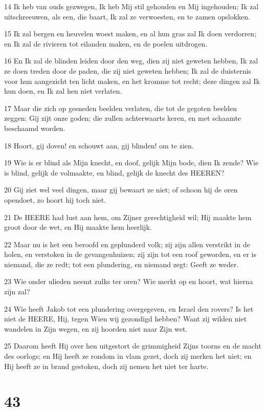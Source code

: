 \par 14 Ik heb van ouds gezwegen, Ik heb Mij stil gehouden en Mij ingehouden; Ik zal uitschreeuwen, als een, die baart, Ik zal ze verwoesten, en te zamen opslokken.
\par 15 Ik zal bergen en heuvelen woest maken, en al hun gras zal Ik doen verdorren; en Ik zal de rivieren tot eilanden maken, en de poelen uitdrogen.
\par 16 En Ik zal de blinden leiden door den weg, dien zij niet geweten hebben, Ik zal ze doen treden door de paden, die zij niet geweten hebben; Ik zal de duisternis voor hun aangezicht ten licht maken, en het kromme tot recht; deze dingen zal Ik hun doen, en Ik zal hen niet verlaten.
\par 17 Maar die zich op gesneden beelden verlaten, die tot de gegoten beelden zeggen: Gij zijt onze goden; die zullen achterwaarts keren, en met schaamte beschaamd worden.
\par 18 Hoort, gij doven! en schouwt aan, gij blinden! om te zien.
\par 19 Wie is er blind als Mijn knecht, en doof, gelijk Mijn bode, dien Ik zende? Wie is blind, gelijk de volmaakte, en blind, gelijk de knecht des HEEREN?
\par 20 Gij ziet wel veel dingen, maar gij bewaart ze niet; of schoon hij de oren opendoet, zo hoort hij toch niet.
\par 21 De HEERE had lust aan hem, om Zijner gerechtigheid wil; Hij maakte hem groot door de wet, en Hij maakte hem heerlijk.
\par 22 Maar nu is het een beroofd en geplunderd volk; zij zijn allen verstrikt in de holen, en verstoken in de gevangenhuizen; zij zijn tot een roof geworden, en er is niemand, die ze redt; tot een plundering, en niemand zegt: Geeft ze weder.
\par 23 Wie onder ulieden neemt zulks ter oren? Wie merkt op en hoort, wat hierna zijn zal?
\par 24 Wie heeft Jakob tot een plundering overgegeven, en Israel den rovers? Is het niet de HEERE, Hij, tegen Wien wij gezondigd hebben? Want zij wilden niet wandelen in Zijn wegen, en zij hoorden niet naar Zijn wet.
\par 25 Daarom heeft Hij over hen uitgestort de grimmigheid Zijns toorns en de macht des oorlogs; en Hij heeft ze rondom in vlam gezet, doch zij merken het niet; en Hij heeft ze in brand gestoken, doch zij nemen het niet ter harte.

\chapter{43}

